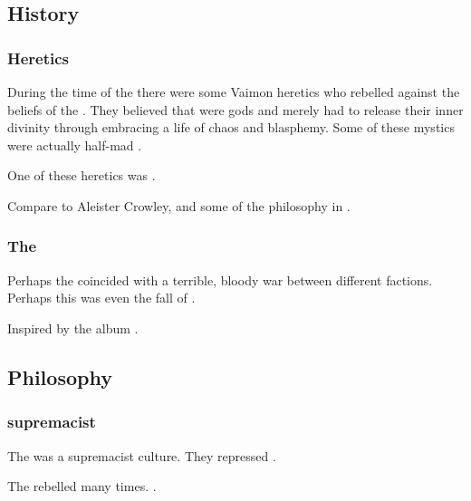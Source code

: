 \subsection{History}





\subsubsection{Heretics}
During the time of the \VaimonCaliphate there were some Vaimon heretics who rebelled against the beliefs of the \caliphate. 
They believed that \humans{} were gods and merely had to release their inner divinity through embracing a life of chaos and blasphemy. 
Some of these mystics were actually half-mad . 

One of these heretics was . 

Compare to Aleister Crowley, and some of the philosophy in . 





\subsubsection{The \Darkfall}
\index{\Darkfall}
Perhaps the  coincided with a terrible, bloody war between different \resphan factions. 
Perhaps this was even the fall of \Kezerad. 

Inspired by the album .









\subsection{Philosophy}





\subsubsection{\Human supremacist}
The \VaimonCaliphate was a \human supremacist culture. 
They repressed \scathae. 

The \scathae rebelled many times. 
. 

